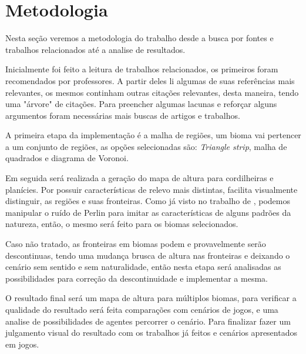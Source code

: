 \chapter{Metodologia}
Nesta seção veremos a metodologia do trabalho desde a busca por fontes e trabalhos
relacionados até a analise de resultados.

Inicialmente foi feito a leitura de trabalhos relacionados, os primeiros
foram recomendados por professores. A partir deles li algumas de suas
referências mais relevantes, os mesmos continham outras citações relevantes,
desta maneira, tendo uma "árvore" de citações.
Para preencher algumas lacunas e reforçar alguns argumentos foram necessárias
mais buscas de artigos e trabalhos.

A primeira etapa da implementação é a malha de regiões, um
bioma vai pertencer a um conjunto de regiões, as opções
selecionadas são: \textit{Triangle strip}, malha de quadrados e diagrama de
Voronoi.

Em seguida será realizada a geração do mapa de altura para cordilheiras e planícies.
Por possuir características de relevo mais distintas, facilita visualmente distinguir,
as regiões e suas fronteiras. %
Como já visto no trabalho de \cite{carli2012canion}, podemos manipular o ruído
de Perlin para imitar as características de alguns padrões da natureza, então, 
o mesmo será feito para os biomas selecionados.

Caso não tratado, as fronteiras em biomas podem e provavelmente serão
descontinuas, tendo uma mudança brusca de altura nas fronteiras e deixando o
cenário sem sentido e sem naturalidade, então nesta etapa será analisadas as
possibilidades para correção da descontinuidade e implementar a mesma.

O resultado final será um mapa de altura para múltiplos biomas, para verificar
a qualidade do resultado será feita comparações com cenários de jogos, e uma
analise de possibilidades de agentes percorrer o cenário. Para finalizar fazer
um julgamento visual do resultado com os trabalhos já feitos  e cenários apresentados em jogos.